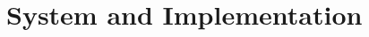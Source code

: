 \documentclass[sigplan, nonacm]{acmart}
\begin{document}





\section{System and Implementation}
\end{document}

